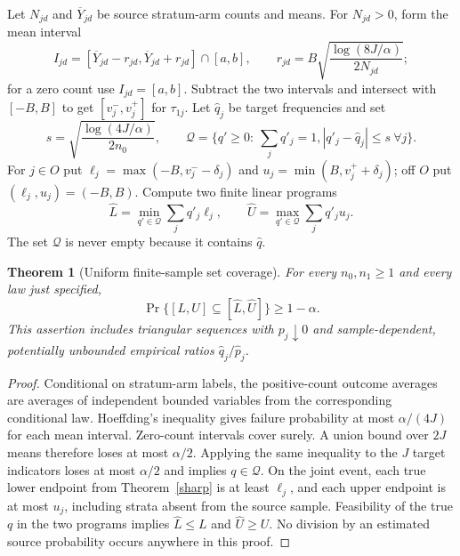 \documentclass[11pt]{article}
\newtheorem{theorem}{Theorem}
\theoremstyle{remark}\newtheorem{remark}[theorem]{Remark}
\begin{document}
Let $N_{jd}$ and $\overline Y_{jd}$ be source stratum-arm counts and means. For $N_{jd}>0$, form the mean interval
\[
 I_{jd}=[\overline Y_{jd}-r_{jd},\overline Y_{jd}+r_{jd}]\cap[a,b],
 \qquad r_{jd}=B\sqrt{\frac{\log(8J/\alpha)}{2N_{jd}}};
\]
for a zero count use $I_{jd}=[a,b]$. Subtract the two intervals and intersect with $[-B,B]$ to get $[v_j^-,v_j^+]$ for $\tau_{1j}$. Let $\widehat q_j$ be target frequencies and set
\[
 s=\sqrt{\frac{\log(4J/\alpha)}{2n_0}},\qquad
 \mathcal Q=\{q'\geq0:\ \textstyle\sum_jq'_j=1,                  |q'_j-\widehat q_j|\leq s\ \forall j\}.
\]
For $j\in O$ put $\ell_j=\max(-B,v_j^- -\delta_j)$ and
$u_j=\min(B,v_j^+ +\delta_j)$; off $O$ put $(\ell_j,u_j)=(-B,B)$.
Compute two finite linear programs
\[
 \widehat L=\min_{q'\in\mathcal Q}\sum_jq'_j\ell_j,
 \qquad \widehat U=\max_{q'\in\mathcal Q}\sum_jq'_ju_j.
\]
The set $\mathcal Q$ is never empty because it contains $\widehat q$.

\begin{theorem}[Uniform finite-sample set coverage]\label{honest}
For every $n_0,n_1\geq1$ and every law just specified,
\[
 \Pr\{[L,U]\subseteq[\widehat L,\widehat U]\}\geq1-\alpha.
\]
This assertion includes triangular sequences with $p_j\downarrow0$ and sample-dependent, potentially unbounded empirical ratios $\widehat q_j/\widehat p_j$.
\end{theorem}
\begin{proof}
Conditional on stratum-arm labels, the positive-count outcome averages are averages of independent bounded variables from the corresponding conditional law. Hoeffding's inequality gives failure probability at most $\alpha/(4J)$ for each mean interval. Zero-count intervals cover surely. A union bound over $2J$ means therefore loses at most $\alpha/2$. Applying the same inequality to the $J$ target indicators loses at most $\alpha/2$ and implies $q\in\mathcal Q$. On the joint event, each true lower endpoint from Theorem~\ref{sharp} is at least $\ell_j$, and each upper endpoint is at most $u_j$, including strata absent from the source sample. Feasibility of the true $q$ in the two programs implies $\widehat L\leq L$ and $\widehat U\geq U$. No division by an estimated source probability occurs anywhere in this proof.
\end{proof}
\end{document}
